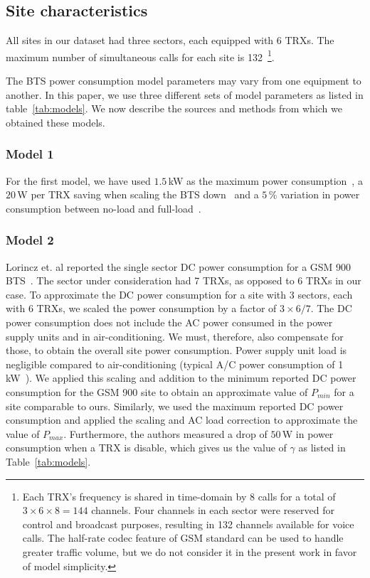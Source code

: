 \subsection{Site characteristics}
\label{subsec:sitetypes} All sites in our dataset had three sectors, each equipped with 6 TRXs. The maximum number of simultaneous calls for each site is 132~\footnote{Each TRX's frequency is shared in time-domain  by 8 calls for  a total of $3\times6\times8=144$ channels. Four channels in each sector were reserved for control and broadcast purposes, resulting in 132 channels available for voice calls. The half-rate codec feature of GSM standard can be used to handle greater traffic volume, but we do not consider it in the present work in favor of model simplicity.}. 

The BTS power consumption model parameters may vary from one equipment to another. In this paper, we use three different sets of model parameters as listed in table~\ref{tab:models}. We now describe the sources and methods from which we obtained these models.

\subsubsection{Model 1}
\label{subsubsec:model1}For the first model, we have used $1.5$\,kW as the maximum power consumption~\cite{mbakwe:btshybribpower:2011:necec}, a $20$\,W per TRX saving when scaling the BTS down~\cite{flexibsc} and a $5$\,\% variation in power consumption between no-load and full-load~\cite{Peng:2011:BTSSaving:Mobicom}.

\subsubsection{Model 2}
\label{subsubsec:model2} Lorincz et. al reported the single sector DC power consumption for a GSM 900 BTS~\cite{Lorincz:BTS-Measure:Sensors:2012}. The sector under consideration had 7 TRXs, as opposed to 6 TRXs in our case. To approximate the DC power consumption for a site with 3 sectors, each with 6 TRXs, we scaled the power consumption by a factor of $3\times6/7$. The DC power consumption does not include the AC power consumed in the power supply units and in air-conditioning. We must, therefore, also compensate for those, to obtain the overall site power consumption. Power supply unit load is negligible compared to air-conditioning (typical A/C power consumption of 1 kW~\cite{mbakwe:btshybribpower:2011:necec}). We applied this scaling and addition to the minimum reported DC power consumption for the GSM 900 site to obtain an approximate value of $P_{min}$ for a site comparable to ours. Similarly, we used the maximum reported DC power consumption and applied the scaling and AC load correction to approximate the value of $P_{max}$. Furthermore, the authors measured a drop of $50$\,W in power consumption when a TRX is disable, which gives us the value of $\gamma$ as listed in Table~\ref{tab:models}.


